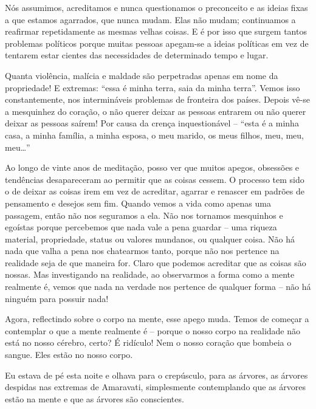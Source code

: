 Nós assumimos, acreditamos e nunca questionamos o preconceito e as ideias fixas
a que estamos agarrados, que nunca mudam. Elas não mudam; continuamos a
reafirmar repetidamente as mesmas velhas coisas. E é por isso que surgem tantos
problemas políticos porque muitas pessoas apegam-se a ideias políticas em vez de
tentarem estar cientes das necessidades de determinado tempo e lugar.

Quanta violência, malícia e maldade são perpetradas apenas em nome da
propriedade! E extremas: ``essa é minha terra, saia da minha terra''. Vemos isso
constantemente, nos intermináveis problemas de fronteira dos países. Depois
vê-se a mesquinhez do coração, o não querer deixar as pessoas entrarem ou não
querer deixar as pessoas saírem! Por causa da crença inquestionável -- ``esta é
a minha casa, a minha família, a minha esposa, o meu marido, os meus filhos,
meu, meu, meu\ldots{}''

Ao longo de vinte anos de meditação, posso ver que muitos apegos, obsessões e
tendências desapareceram ao permitir que as coisas cessem. O processo tem sido o
de deixar as coisas irem em vez de acreditar, agarrar e renascer em padrões de
pensamento e desejos sem fim. Quando vemos a vida como apenas uma passagem,
então não nos seguramos a ela. Não nos tornamos mesquinhos e egoístas porque
percebemos que nada vale a pena guardar -- uma riqueza material, propriedade,
status ou valores mundanos, ou qualquer coisa. Não há nada que valha a pena nos
chatearmos tanto, porque não nos pertence na realidade seja de que maneira for.
Claro que podemos acreditar que as coisas são nossas. Mas investigando na
realidade, ao observarmos a forma como a mente realmente é, vemos que nada na
verdade nos pertence de qualquer forma -- não há ninguém para possuir nada!

Agora, reflectindo sobre o corpo na mente, esse apego muda. Temos de começar a
contemplar o que a mente realmente é -- porque o nosso corpo na realidade não
está no nosso cérebro, certo? É ridículo! Nem o nosso coração que bombeia o
sangue. Eles estão no nosso corpo.

Eu estava de pé esta noite e olhava para o crepúsculo, para as árvores, as
árvores despidas nas extremas de Amaravati, simplesmente contemplando que as
árvores estão na mente e que as árvores são conscientes.

